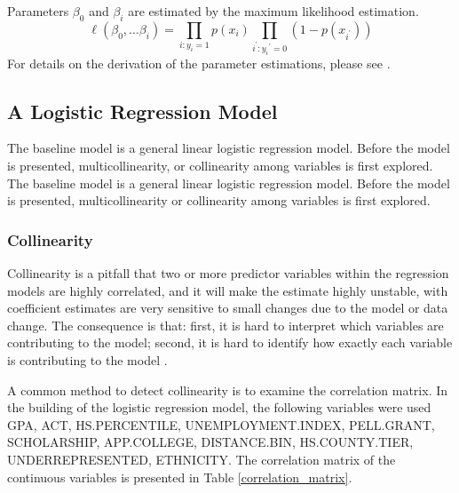 \documentclass[12pt,english]{report}
\begin{document}

Parameters $\beta_0$ and $\beta_i$ are estimated by the maximum likelihood
estimation.
\begin{equation}
\ell(\beta_0,\ldots \beta_i) = \prod_{i:y_i=1} p(x_i)
\prod_{i^{'}:y_i{^{'}=0}} (1-p(x_{i^{'}}))
\end{equation}
For details on the derivation of the parameter estimations, please see
\citet{Hosmer2013}.

\subsection{A Logistic Regression Model}

The baseline model is a general linear logistic regression model.  Before the
model is presented, multicollinearity, or collinearity among variables is first
explored. The baseline model is a general linear logistic regression model. 
Before the model is presented, multicollinearity or collinearity among
variables 
is first explored.

\subsubsection{Collinearity}

Collinearity is a pitfall that two or more predictor variables within the
regression 
models are highly correlated, and it will make the estimate highly unstable,
with 
coefficient estimates are very sensitive to small changes due to the model or 
data change. The consequence is that: first, it is hard to interpret which
variables are contributing to the model; second, it is hard to identify how
exactly
each variable is contributing to the model \citep{belsley2005regression,
Midi2010}.

A common method to detect collinearity is to examine the correlation matrix. In
the building
of the logistic regression model, the following variables were used GPA, ACT,
HS.PERCENTILE,
UNEMPLOYMENT.INDEX, PELL.GRANT, SCHOLARSHIP, APP.COLLEGE, DISTANCE.BIN,
HS.COUNTY.TIER, 
UNDERREPRESENTED, ETHNICITY.  The correlation matrix of the continuous
variables is
presented in Table \ref{correlation_matrix}.  
\end{document}
